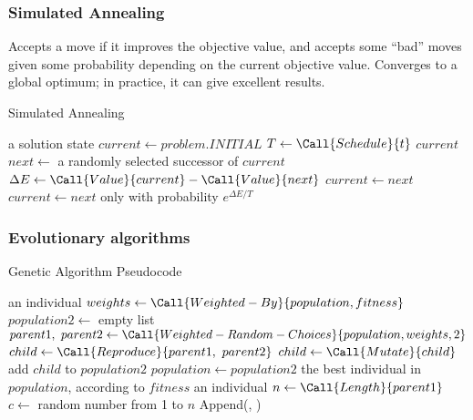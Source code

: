 \documentclass[exam={Midterm}]{cs581exam}
\begin{document}
\subsubsection{Simulated Annealing}\label{subsubsec:4.1.2}
Accepts a move if it improves the objective value, and accepts some ``bad'' moves given some probability depending on the current objective value.
Converges to a global optimum; in practice, it can give excellent results.
\begin{algorithm}[H]
	\caption{Simulated Annealing}\label{alg:simulated-annealing}
	\begin{algorithmic}[1]
	 \Returns a solution state
		\State $current\gets problem.INITIAL$
			\State $T\gets\Call{Schedule}{t}$
				\Return $current$
			\EndIf
			\State $next\gets$ a randomly selected successor of $current$
			\State $\Delta E\gets\Call{Value}{current} - \Call{Value}{next}$
				$current\gets next$
			\Else\
				$current\gets next$ only with probability $e^{\Delta E/T}$
			\EndIf
		\EndFor
	\EndFunction
	\end{algorithmic}
\end{algorithm}

\setcounter{subsection}{3}%
\subsubsection{Evolutionary algorithms}\label{subsubsec:4.1.4}
\begin{algorithm}[H]
	\caption{Genetic Algorithm Pseudocode}\label{alg:genetric-algorithm}
	\begin{algorithmic}[1]
		 \Returns an individual
		\Repeat
			\State $weights\gets\Call{Weighted-By}{population, fitness}$
			\State $population2\gets$ empty list
				\State $parent1,\ parent2\gets\Call{Weighted-Random-Choices}{population, weights, 2}$
				\State $child\gets\Call{Reproduce}{parent1,\ parent2}$
					$child\gets\Call{Mutate}{child}$
				\EndIf
				\State add $child$ to $population2$
			\EndFor
			\State $population\gets population2$
		\State \Return the best individual in $population$, according to $fitness$
		\EndFunction
		 \Returns an individual
			\State $n\gets\Call{Length}{parent1}$
			\State $c\gets$ random number from 1 to $n$
			\State \Return Append(, )
		\EndFunction
	\end{algorithmic}
\end{algorithm}
\end{document}
